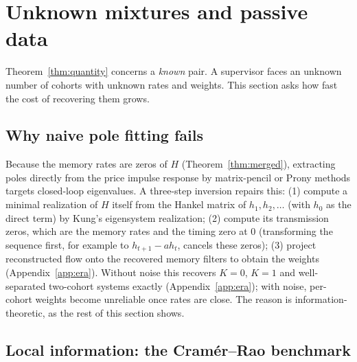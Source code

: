 \section{Unknown mixtures and passive data}\label{sec:mixtures}

Theorem~\ref{thm:quantity} concerns a \emph{known} pair. A supervisor faces an unknown number of cohorts with unknown rates and weights. This section asks how fast the cost of recovering them grows.

\subsection{Why naive pole fitting fails}

Because the memory rates are zeros of $H$ (Theorem~\ref{thm:merged}), extracting poles directly from the price impulse response by matrix-pencil or Prony methods targets closed-loop eigenvalues. A three-step inversion repairs this: (1) compute a minimal realization of $H$ itself from the Hankel matrix of $h_1,h_2,\ldots$ (with $h_0$ as the direct term) by Kung's eigensystem realization; (2) compute its transmission zeros, which are the memory rates and the timing zero at $0$ (transforming the sequence first, for example to $h_{t+1}-ah_t$, cancels these zeros); (3) project reconstructed flow onto the recovered memory filters to obtain the weights (Appendix~\ref{app:era}). Without noise this recovers $K=0$, $K=1$ and well-separated two-cohort systems exactly (Appendix~\ref{app:era}); with noise, per-cohort weights become unreliable once rates are close. The reason is information-theoretic, as the rest of this section shows.

\subsection{Local information: the Cram\'er--Rao benchmark}

